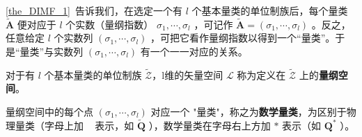 
\begin{issues}
\issueTODO
\end{issues}

\autoref{the_DIMF_1}~告诉我们，在选定一个有 $l$ 个基本量类的单位制族后，每个量类 $\tilde{\boldsymbol{A}}$ 便对应于 $l$ 个实数（量纲指数） $\sigma_1,\cdots,\sigma_l$ ，可记作 $\tilde{\boldsymbol{A}}=(\sigma_1,\cdots,\sigma_l)$ 。反之，任意给定 $l$ 个实数列 $(\sigma_1,\cdots,\sigma_l)$ ，可把它看作量纲指数以得到一个“量类”。于是“量类”与实数列 $(\sigma_1,\cdots,\sigma_l)$ 有一个一一对应的关系。
\begin{definition}{}
对于有 $l$ 个基本量类的单位制族 $\tilde{\mathscr{Z}}$，l维的矢量空间 $\mathscr{L}$ 称为定义在 $\tilde{\mathscr{Z}}$ 上的\textbf{量纲空间}。
\end{definition}
量纲空间中的每个点 $(\sigma_1,\cdots,\sigma_l)$ 对应一个 "量类"，称之为\textbf{数学量类}，为区别于物理量类（字母上加 ~ 表示，如 $\tilde{\boldsymbol{Q}}$ ），数学量类在字母右上方加 $*$ 表示（如 $\boldsymbol{Q}^*$ ）。